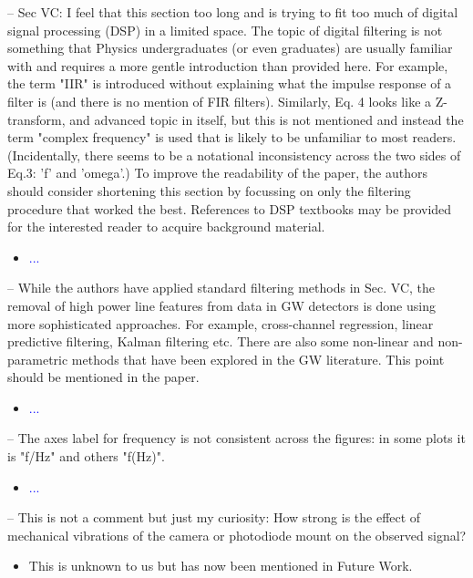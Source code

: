 \documentclass{article}
\newcommand{\todo}{\textcolor{blue}}
\begin{document}
\noindent
-- Sec VC: I feel that this section too long and is trying to fit too much of digital signal processing (DSP) in a limited space. The topic of digital filtering is not something that Physics undergraduates (or even graduates) are usually familiar with and requires a more gentle introduction than provided here. For example, the term "IIR" is introduced without explaining what the impulse response of a filter is (and there is no mention of FIR filters). Similarly, Eq. 4 looks like a Z-transform, and advanced topic in itself, but this is not mentioned and instead the term "complex frequency" is used that is likely to be unfamiliar to most readers. (Incidentally, there seems to be a notational inconsistency across the two sides of Eq.3: 'f' and 'omega'.) To improve the readability of the paper, the authors should consider shortening this section by focussing on only the filtering procedure that worked the best. References to DSP textbooks may be provided for the interested reader to acquire background material. 
\begin{itemize}
\item \todo{...}
\end{itemize}

\noindent
-- While the authors have applied standard filtering methods in Sec. VC, the removal of high power line features from data in GW detectors is done using more sophisticated approaches. For example, cross-channel regression, linear predictive filtering, Kalman filtering etc. There are also some non-linear and non-parametric methods that have been explored in the GW literature. This point should be mentioned in the paper.
\begin{itemize}
\item \todo{...}
\end{itemize}

\noindent
-- The axes label for frequency is not consistent across the figures: in some plots it is "f/Hz" and others "f(Hz)".
\begin{itemize}
\item \todo{...}
\end{itemize}

\noindent
-- This is not a comment but just my curiosity: How strong is the effect of mechanical vibrations of the camera or photodiode mount on the observed signal?

\begin{itemize}
\item This is unknown to us but has now been mentioned in Future Work.
\end{itemize}
\end{document}
